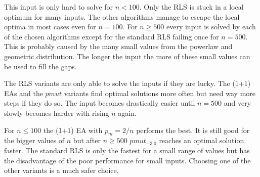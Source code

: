

This input is only hard to solve for $n<100$.
Only the RLS is stuck in a local optimum for many inputs.
The other algorithms manage to escape the local optima in most cases even for $n=100$.
For $n\ge500$ every input is solved by each of the chosen algorithms except for the standard RLS failing once for $n=500$.
This is probably caused by the many small values from the powerlaw and geometric distribution.
The longer the input the more of these small values can be used to fill the gaps.



The RLS variants are only able to solve the inputs if they are lucky.
The (1+1) EAs and the $pmut$ variants find optimal solutions more often but need way more steps if they do so.
The input becomes drastically easier until $n=500$ and very slowly becomes harder with rising $n$ again.



For $n\le100$ the (1+1) EA with $p_m=2/n$ performs the best.
It is still good for the bigger values of $n$ but after $n\ge500$ $pmut_{-3.0}$ reaches an optimal solution faster.
The standard RLS is only the fastest for a small range of values but has the disadvantage of the poor performance for small inputs.
Choosing one of the other variants is a much safer choice.
